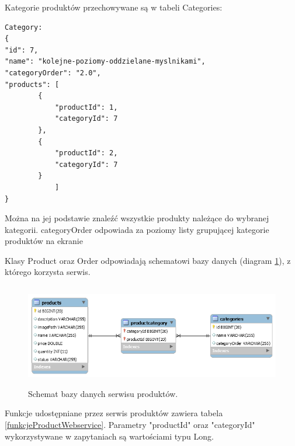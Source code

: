 \documentclass[11pt,a4paper,twoside]{article}
\begin{document}
Kategorie produktów przechowywane są w tabeli Categories:

\begin{lstlisting}
Category: 
{
"id": 7,
"name": "kolejne-poziomy-oddzielane-myslnikami",
"categoryOrder": "2.0",
"products": [
		{
			"productId": 1,
            "categoryId": 7
		},
        {
			"productId": 2,
			"categoryId": 7
        }
            ]
}
\end{lstlisting}
\vspace{-20pt}

Można na jej podstawie znaleźć wszystkie produkty należące do wybranej kategorii. categoryOrder odpowiada za poziomy listy grupującej kategorie produktów na ekranie

Klasy Product oraz Order odpowiadają schematowi bazy danych (diagram \ref{productDB}), z którego korzysta serwis.

\begin{figure}[ht]
\caption{Schemat bazy danych serwisu produktów.}
\label{productDB}
\centering
\includegraphics[height=4.5cm, width=15.7cm]{productDB}
\end{figure}

Funkcje udostępniane przez serwis produktów zawiera tabela \ref{funkcjeProductWebservice}. Parametry "productId" oraz "categoryId" wykorzystywane w zapytaniach są wartościami typu Long.
\end{document}
